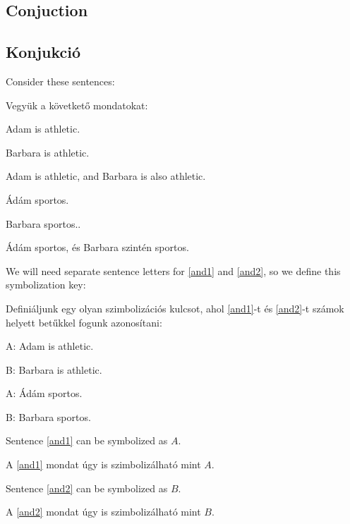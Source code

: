 
\subsection{Conjuction}
\subsection{Konjukció}

Consider these sentences:

Vegyük a követkető mondatokat:


\begin{earg}
\item[\ex{and1}]Adam is athletic.
\item[\ex{and2}]Barbara is athletic.
\item[\ex{and3}]Adam is athletic, and Barbara is also athletic.
\end{earg}

\begin{earg}
\item[\ex{and1}]Ádám sportos.
\item[\ex{and2}]Barbara sportos..
\item[\ex{and3}]Ádám sportos, és Barbara szintén sportos.
\end{earg}

We will need separate sentence letters for \ref{and1} and \ref{and2}, so we define this symbolization key:

Definiáljunk egy olyan szimbolizációs kulcsot, ahol \ref{and1}-t és \ref{and2}-t számok helyett betűkkel fogunk azonosítani:

\begin{ekey}
\item[A:] Adam is athletic.
\item[B:] Barbara is athletic.
\end{ekey}

\begin{ekey}
\item[A:] Ádám sportos.
\item[B:] Barbara sportos.
\end{ekey}

Sentence \ref{and1} can be symbolized as $A$.

A \ref{and1} mondat úgy is szimbolizálható mint $A$.

Sentence \ref{and2} can be symbolized as $B$.

A \ref{and2} mondat úgy is szimbolizálható mint $B$.

